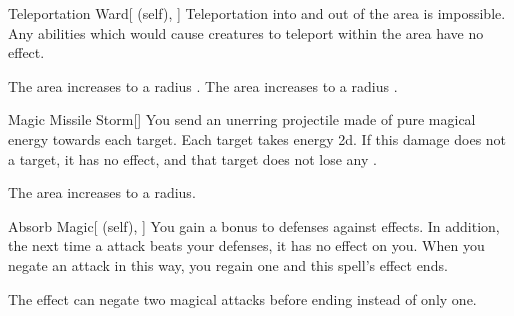 \lowercase{\hypertarget{spell:Teleportation Ward}{}}\label{spell:Teleportation Ward}
\begin{attuneability}[Rank 4]{\hypertarget{spell:Teleportation Ward}{Teleportation Ward}}[ (self), ]
Teleportation into and out of the area is impossible.
Any abilities which would cause creatures to teleport within the area have no effect.

\rankline
{} The area increases to a \areahuge radius .
 The area increases to a \areaext radius .

\end{attuneability}
\vspace{0.25em}



\lowercase{\hypertarget{spell:Magic Missile Storm}{}}\label{spell:Magic Missile Storm}
\begin{freeability}[Rank 5]{\hypertarget{spell:Magic Missile Storm}{Magic Missile Storm}}[]
You send an unerring projectile made of pure magical energy towards each target.
Each target takes energy  \minus2d.
If this damage does not  a target, it has no effect, and that target does not lose any .

\rankline
{} The area increases to a \areamed radius.

\end{freeability}
\vspace{0.25em}



\lowercase{\hypertarget{spell:Absorb Magic}{}}\label{spell:Absorb Magic}
\begin{attuneability}[Rank 6]{\hypertarget{spell:Absorb Magic}{Absorb Magic}}[ (self), ]
You gain a  bonus to defenses against  effects.
In addition, the next time a  attack beats your defenses, it has no effect on you.
When you negate an attack in this way, you regain one  and this spell's effect ends.

\rankline
{} The effect can negate two magical attacks before ending instead of only one.

\end{attuneability}
\vspace{0.25em}



